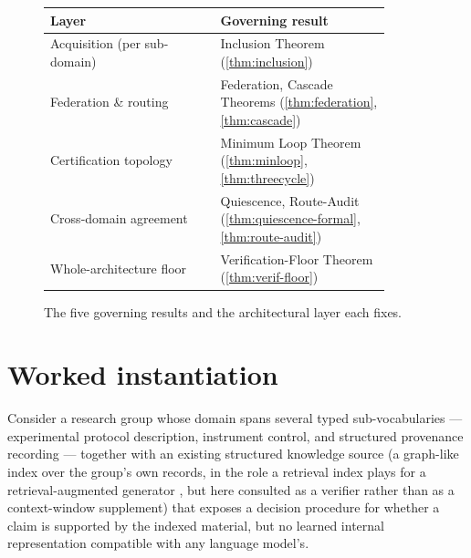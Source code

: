 \documentclass[11pt,twocolumn,a4paper]{article}
\theoremstyle{rdm}
\theoremstyle{definition}
\theoremstyle{remark}
\begin{document}
\begin{figure}[t]
\centering
\begin{tabular}{@{}p{0.44\linewidth}p{0.44\linewidth}@{}}
\toprule
\textbf{Layer} & \textbf{Governing result} \\
\midrule
Acquisition (per sub-domain) & Inclusion Theorem (\ref{thm:inclusion}) \\
Federation \& routing & Federation, Cascade Theorems (\ref{thm:federation}, \ref{thm:cascade}) \\
Certification topology & Minimum Loop Theorem (\ref{thm:minloop}, \ref{thm:threecycle}) \\
Cross-domain agreement & Quiescence, Route-Audit (\ref{thm:quiescence-formal}, \ref{thm:route-audit}) \\
Whole-architecture floor & Verification-Floor Theorem (\ref{thm:verif-floor}) \\
\bottomrule
\end{tabular}
\caption{The five governing results and the architectural layer each fixes.}
\label{tab:layers}
\end{figure}

\section{Worked instantiation}
\label{sec:worked}

Consider a research group whose domain spans several typed sub-vocabularies
--- experimental protocol description, instrument control, and structured
provenance recording --- together with an existing structured knowledge
source (a graph-like index over the group's own records, in the role a
retrieval index plays for a retrieval-augmented generator
\citep{lewis2020rag}, but here consulted as a verifier rather than as a
context-window supplement) that exposes a
decision procedure for whether a claim is supported by the indexed
material, but no learned internal representation compatible with any
language model's.
\end{document}

